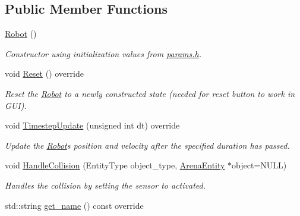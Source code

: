 \subsection*{Public Member Functions}
\begin{DoxyCompactItemize}
\item 
\hyperlink{classRobot_a4fc7c70ae20623f05e06f2ecb388b6c4}{Robot} ()\hypertarget{classRobot_a4fc7c70ae20623f05e06f2ecb388b6c4}{}\label{classRobot_a4fc7c70ae20623f05e06f2ecb388b6c4}

\begin{DoxyCompactList}\small\item\em Constructor using initialization values from \hyperlink{params_8h}{params.\+h}. \end{DoxyCompactList}\item 
void \hyperlink{classRobot_af597fd14927d2cd5308ded62f4e54e29}{Reset} () override\hypertarget{classRobot_af597fd14927d2cd5308ded62f4e54e29}{}\label{classRobot_af597fd14927d2cd5308ded62f4e54e29}

\begin{DoxyCompactList}\small\item\em Reset the \hyperlink{classRobot}{Robot} to a newly constructed state (needed for reset button to work in G\+UI). \end{DoxyCompactList}\item 
void \hyperlink{classRobot_ae790462f8782efcfd26082eedec30ed5}{Timestep\+Update} (unsigned int dt) override
\begin{DoxyCompactList}\small\item\em Update the \hyperlink{classRobot}{Robot}\textquotesingle{}s position and velocity after the specified duration has passed. \end{DoxyCompactList}\item 
void \hyperlink{classRobot_a176a9958cc2ea1e585ddb2cdc82c0bdb}{Handle\+Collision} (Entity\+Type object\+\_\+type, \hyperlink{classArenaEntity}{Arena\+Entity} $\ast$object=N\+U\+LL)\hypertarget{classRobot_a176a9958cc2ea1e585ddb2cdc82c0bdb}{}\label{classRobot_a176a9958cc2ea1e585ddb2cdc82c0bdb}

\begin{DoxyCompactList}\small\item\em Handles the collision by setting the sensor to activated. \end{DoxyCompactList}\item 
std\+::string \hyperlink{classRobot_a3f77c13705b8f60480d21d8d936dc39e}{get\+\_\+name} () const override\hypertarget{classRobot_a3f77c13705b8f60480d21d8d936dc39e}{}\label{classRobot_a3f77c13705b8f60480d21d8d936dc39e}


\end{DoxyCompactItemize}
